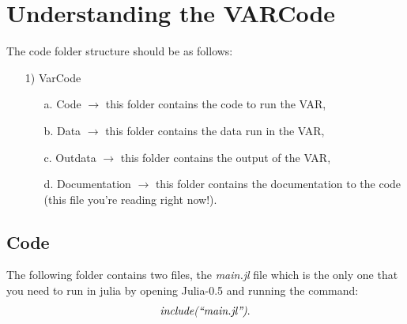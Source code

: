 \documentclass[11pt]{article}
\begin{document}
\section{Understanding the VARCode}
The code folder structure should be as follows:
\begin{itemize}
\item[1)] VarCode
  \begin{itemize}
  \item[a.] Code $\rightarrow$ this folder contains the code to run the VAR,
  \item[b.] Data $\rightarrow$ this folder contains the data run in the VAR,
  \item[c.] Outdata $\rightarrow$ this folder contains the output of the VAR,
  \item[d.] Documentation $\rightarrow$ this folder contains the documentation to the code (this file you're reading right now!).
  \end{itemize}
\end{itemize}

\subsection{Code}
The following folder contains two files, the \textit{main.jl} file which is the only one that you need to run in julia by opening Julia-0.5 and running the command: $$\text{\textit{include(``main.jl'')}}.$$
\end{document}
